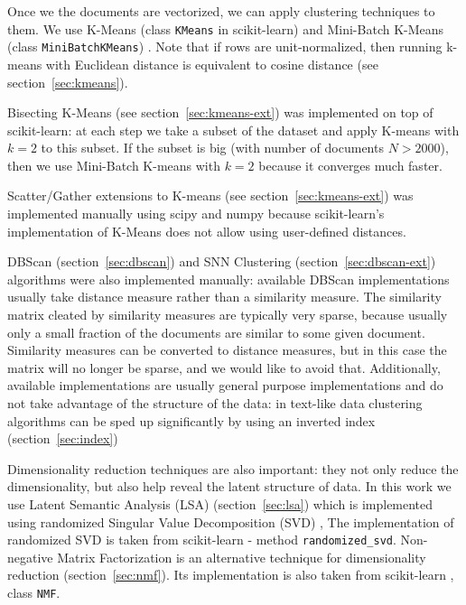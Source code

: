 Once we the documents are vectorized, we can apply clustering techniques
to them. We use K-Means (class \verb|KMeans| in scikit-learn) and 
Mini-Batch K-Means (class \verb|MiniBatchKMeans|) \cite{scikit-learn}.
Note that if rows are unit-normalized, then running k-means with 
Euclidean distance is equivalent to cosine distance 
(see section~\ref{sec:kmeans}).

Bisecting K-Means (see section~\ref{sec:kmeans-ext}) was implemented on top of 
scikit-learn: at each step we take a subset of the dataset and apply 
K-means with $k = 2$ to this subset. If the subset is big (with number of 
documents $N > 2000$), then we use Mini-Batch K-means with $k=2$ 
because it converges much faster. 


Scatter/Gather extensions to K-means (see section~\ref{sec:kmeans-ext}) was 
implemented manually  using scipy \cite{scipy} and numpy \cite{walt2011numpy} because 
scikit-learn's implementation of K-Means does not allow using user-defined distances.


DBScan (section~\ref{sec:dbscan}) and SNN Clustering (section~\ref{sec:dbscan-ext})
algorithms were also implemented manually:
available DBScan implementations usually take distance measure rather than 
a similarity measure. The similarity matrix cleated by similarity measures 
are typically very sparse, because usually only a small fraction of the documents 
are similar to some given document. Similarity measures 
can be converted to distance measures, but in this case 
the matrix will no longer be sparse, and we would like to avoid that.
Additionally, available implementations are usually general purpose 
implementations and do not take advantage of the structure of the data:
in text-like data clustering algorithms can be sped up significantly 
by using an inverted index (section~\ref{sec:index})


Dimensionality reduction techniques are also important: they 
not only reduce the dimensionality, but also help reveal the latent 
structure of data. In this work we use Latent Semantic Analysis (LSA) (section~\ref{sec:lsa})
which is implemented using randomized Singular Value Decomposition (SVD) 
\cite{tropp2009finding}, The implementation of randomized SVD is taken from scikit-learn 
\cite{scikit-learn} - method \verb|randomized_svd|. Non-negative Matrix Factorization 
is an alternative technique for dimensionality reduction (section~\ref{sec:nmf}). 
Its implementation is also taken from scikit-learn \cite{scikit-learn}, 
class \verb|NMF|.

